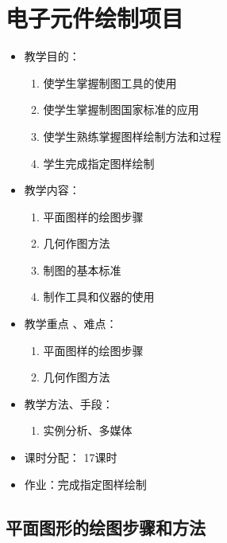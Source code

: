 \chapter{电子元件绘制项目}
\begin{itemize}
\item 教学目的：
\begin{enumerate}
\item 使学生掌握制图工具的使用
\item 使学生掌握制图国家标准的应用
\item 使学生熟练掌握图样绘制方法和过程
\item 学生完成指定图样绘制
\end{enumerate}
\item 教学内容：
\begin{enumerate}
\item 平面图样的绘图步骤
\item 几何作图方法
\item 制图的基本标准
\item 制作工具和仪器的使用
\end{enumerate}
\item 教学重点 、难点：
\begin{enumerate}
\item 平面图样的绘图步骤
\item 几何作图方法
\end{enumerate}
\item 教学方法、手段：
\begin{enumerate}
\item 实例分析、多媒体
\end{enumerate}
\item 课时分配：
17课时
\item 作业：完成指定图样绘制
\end{itemize}

\section{平面图形的绘图步骤和方法}

